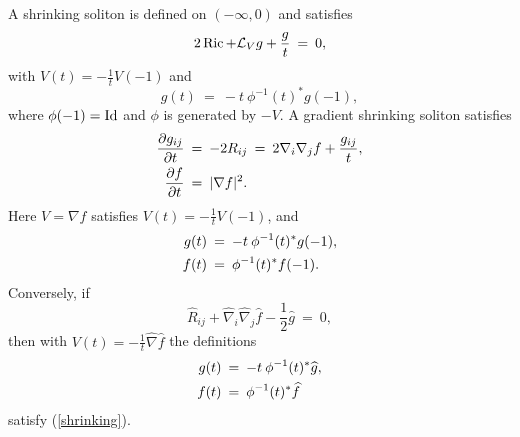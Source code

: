 A shrinking soliton is defined on $(-\infty,0)$ and satisfies
\begin{equation}
2\operatorname{Ric}+{\mathcal L}_Vg+\frac gt\:=\:0,
\end{equation}
with $V(t)=-\frac1tV(-1)$ and
\begin{equation} \label{shrinkingflow}
g(t)\:=\:-t\:\phi^{-1}(t)^*g(-1),
\end{equation}
where $\phi(-1)=\operatorname{Id}$ and $\phi$ is generated by $-V$.
A gradient shrinking soliton satisfies
\begin{align} \label{shrinking}
\frac{\partial g_{ij}}{\partial t}\: & = \:-2R_{ij}\:=\:
2\nabla_i\nabla_jf+\frac{g_{ij}}t,\\
\frac{\partial f}{\partial t}\: & = \:|\nabla f|^2. \notag
\end{align}
Here $V=\nabla f$ satisfies $V(t)=-\frac1tV(-1)$, and
\begin{align} \label{shrinkingsoln}
g(t)\: & = \:-t\:\phi^{-1}(t)^*g(-1),\\
f(t)\: & = \:\phi^{-1}(t)^*f(-1). \notag
\end{align}
Conversely, if
\begin{equation}
\widehat R_{ij}+\widehat\nabla_i\widehat\nabla_j\widehat f
-\frac12\widehat g\:=\:0,
\end{equation}
then with $V(t)=-\frac1t\widehat\nabla\widehat f$ the definitions
\begin{align}
g(t)\: & = \:-t\:\phi^{-1}(t)^*\widehat g,\\
f(t)\: & = \:\phi^{-1}(t)^*\widehat f \notag
\end{align}
satisfy (\ref{shrinking}).

